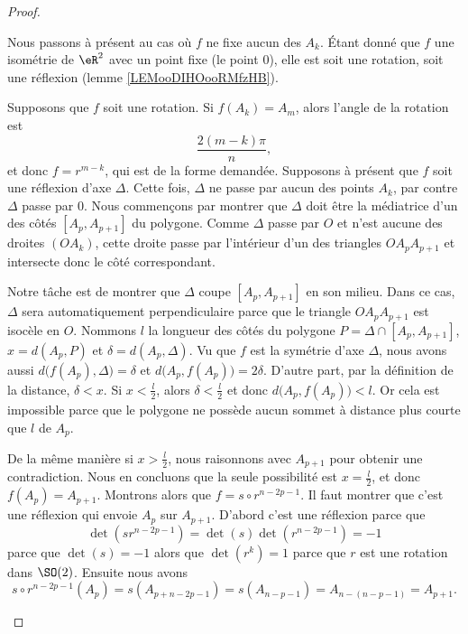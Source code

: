 \begin{proof}
\begin{subproof}
		Nous passons à présent au cas où \( f\) ne fixe aucun des \( A_k\). Étant donné que \( f\) une isométrie de \( \eR^2\) avec un point fixe (le point \( 0\)), elle est soit une rotation, soit une réflexion (lemme \ref{LEMooDIHOooRMfzHB}).
		\begin{subproof}
			Supposons que \( f\) soit une rotation. Si \( f(A_k)=A_m\), alors l'angle de la rotation est
			\begin{equation}
				\frac{ 2(m-k)\pi }{ n },
			\end{equation}
			et donc \( f=r^{m-k}\), qui est de la forme demandée.
			Supposons à présent que \( f\) soit une réflexion d'axe \( \Delta\). Cette fois, \( \Delta\) ne passe par aucun des points \( A_k\), par contre \( \Delta\) passe par \( 0\). Nous commençons par montrer que \( \Delta\) doit être la médiatrice d'un des côtés \( [A_p,A_{p+1}]\) du polygone. Comme \( \Delta\) passe par \( O\) et n'est aucune des droites \( (OA_k)\), cette droite passe par l'intérieur d'un des triangles \( OA_pA_{p+1}\) et intersecte donc le côté correspondant.

			Notre tâche est de montrer que \( \Delta\) coupe \( [A_p,A_{p+1}]\) en son milieu. Dans ce cas, \( \Delta\) sera automatiquement perpendiculaire parce que le triangle \( OA_pA_{p+1}\) est isocèle en \( O\). Nommons \( l\) la longueur des côtés du polygone \( P=\Delta\cap[A_p,A_{p+1}]\), \( x=d(A_p,P)\) et \( \delta=d(A_p,\Delta)\). Vu que \( f\) est la symétrie d'axe \( \Delta\), nous avons aussi \( d\big( f(A_p),\Delta \big)=\delta\) et \( d\big( A_p,f(A_p) \big)=2\delta\). D'autre part, par la définition de la distance, \( \delta<x\). Si \( x<\frac{ l }{2}\), alors \( \delta<\frac{l}{2}\) et donc \( d\big( A_p,f(A_p) \big)<l\). Or cela est impossible parce que le polygone ne possède aucun sommet à distance plus courte que \( l\) de \( A_p\).

			De la même manière si \( x>\frac{ l }{2}\), nous raisonnons avec \( A_{p+1}\) pour obtenir une contradiction. Nous en concluons que la seule possibilité est \( x=\frac{ l }{2}\), et donc \( f(A_p)=A_{p+1}\). Montrons alors que \( f=s\circ r^{n-2p-1}\). Il faut montrer que c'est une réflexion qui envoie \( A_p\) sur \( A_{p+1}\). D'abord c'est une réflexion parce que
			\begin{equation}
				\det(sr^{n-2p-1})=\det(s)\det(r^{n-2p-1})=-1
			\end{equation}
			parce que \( \det(s)=-1\) alors que \( \det(r^k)=1\) parce que \( r\) est une rotation dans \( \SO(2)\). Ensuite nous avons
			\begin{equation}
				s\circ r^{n-2p-1}(A_p)=s(A_{p+n-2p-1})=s(A_{n-p-1})=A_{n-(n-p-1)}=A_{p+1}.
			\end{equation}


\end{subproof}
\end{subproof}
\end{proof}
